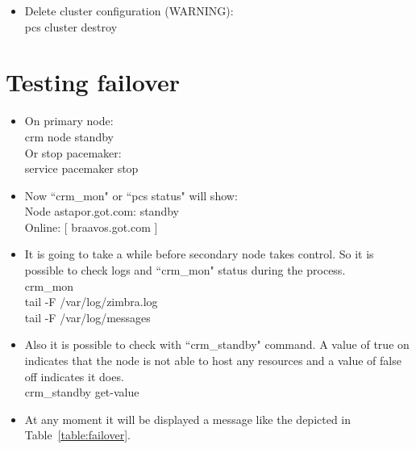 \documentclass[a4paper, 12pt]{book}
\begin{document}
\begin{itemize}
	\item Delete cluster configuration (WARNING):\\
		pcs cluster destroy\\
\end{itemize}



\section{Testing failover}
\label{sec:failover}


\begin{itemize}
	\item On primary node:\\
		crm node standby\\
	Or stop pacemaker:\\
		service pacemaker stop\\
\end{itemize}


\begin{itemize}
	\item Now ``crm\_mon" or ``pcs status" will show:\\
		Node astapor.got.com: standby\\
		Online: [ braavos.got.com ]\\
\end{itemize}


\begin{itemize}
	\item It is going to take a while before secondary node takes control. So it is possible to check logs and ``crm\_mon" status during the process.\\
		crm\_mon\\
		tail -F /var/log/zimbra.log\\
		tail -F /var/log/messages\\
\end{itemize}


\begin{itemize}
	\item Also it is possible to check with ``crm\_standby" command. A value of true \textbar on indicates that the node is not able to host any resources and a value of false \textbar off indicates it does.\\
		crm\_standby \textminus \textminus get-value
\end{itemize}


\begin{itemize}
	\item At any moment it will be displayed a message like the depicted in Table~\ref{table:failover}.
\end{itemize}
\end{document}
